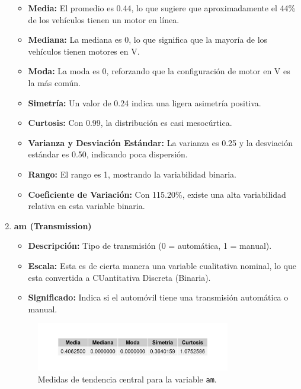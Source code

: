 \documentclass{article}
\begin{document}
\begin{enumerate}
	      \begin{itemize}
		      \item \textbf{Media:} El promedio es 0.44, lo que sugiere que aproximadamente el 44\% de los vehículos tienen un motor en línea.
		      \item \textbf{Mediana:} La mediana es 0, lo que significa que la mayoría de los vehículos tienen motores en V.
		      \item \textbf{Moda:} La moda es 0, reforzando que la configuración de motor en V es la más común.
		      \item \textbf{Simetría:} Un valor de 0.24 indica una ligera asimetría positiva.
		      \item \textbf{Curtosis:} Con 0.99, la distribución es casi mesocúrtica.
		      \item \textbf{Varianza y Desviación Estándar:} La varianza es 0.25 y la desviación estándar es 0.50, indicando poca dispersión.
		      \item \textbf{Rango:} El rango es 1, mostrando la variabilidad binaria.
		      \item \textbf{Coeficiente de Variación:} Con 115.20\%, existe una alta variabilidad relativa en esta variable binaria.
	      \end{itemize}

	\item \textbf{am (Transmission)}

	      \begin{itemize}
		      \item \textbf{Descripción:} Tipo de transmisión (0 = automática, 1 = manual).
		      \item \textbf{Escala:} Esta es de cierta manera una variable cualitativa nominal, lo que esta convertida a CUantitativa Discreta (Binaria).
		      \item \textbf{Significado:} Indica si el automóvil tiene una transmisión automática o manual.
	      \end{itemize}

	      \begin{figure}[H]
		      \centering
		      \includegraphics[width=0.8\textwidth]{MTC/am_central.png}
		      \caption{Medidas de tendencia central para la variable \texttt{am}.}
		      \label{fig:am_central}
	      \end{figure}


\end{enumerate}
\end{document}
